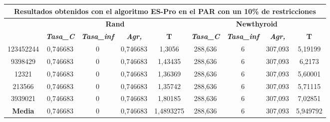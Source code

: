 \documentclass[12pt, spanish]{article}
\begin{document}
\begin{table}[H]
\begin{tabular}{|c|c|c|c|c|c|c|c|c|}
\hline
\multicolumn{9}{|c|}{\textbf{Resultados obtenidos con el algoritmo ES-Pro en el PAR con un 10\% de restricciones}}                                                                                                \\ \hline
\multirow{2}{*}{} & \multicolumn{4}{c|}{\textbf{Rand}}                                                            & \multicolumn{4}{c|}{\textbf{Newthyroid}}                                                      \\ \cline{2-9} 
                  & \textit{\textbf{Tasa\_C}} & \textit{\textbf{Tasa\_inf}} & \textit{\textbf{Agr,}} & \textbf{T} & \textit{\textbf{Tasa\_C}} & \textit{\textbf{Tasa\_inf}} & \textit{\textbf{Agr,}} & \textbf{T} \\ \hline
123452244         & 0,746683                  & 0                           & 0,746683               & 1,3056     & 288,636                   & 6                           & 307,093                & 5,19199    \\ \hline
9398429           & 0,746683                  & 0                           & 0,746683               & 1,43435    & 288,636                   & 6                           & 307,093                & 6,2173     \\ \hline
12321             & 0,746683                  & 0                           & 0,746683               & 1,36369    & 288,636                   & 6                           & 307,093                & 5,60001    \\ \hline
213566            & 0,746683                  & 0                           & 0,746683               & 1,35742    & 288,636                   & 6                           & 307,093                & 5,71115    \\ \hline
3939021           & 0,746683                  & 0                           & 0,746683               & 1,80185    & 288,636                   & 6                           & 307,093                & 7,02851    \\ \hline
\textbf{Media}    & 0,746683                  & 0                           & 0,746683               & 1,4893275  & 288,636                   & 6                           & 307,093                & 5,949792   \\ \hline
\end{tabular}
\end{table}
\end{document}
